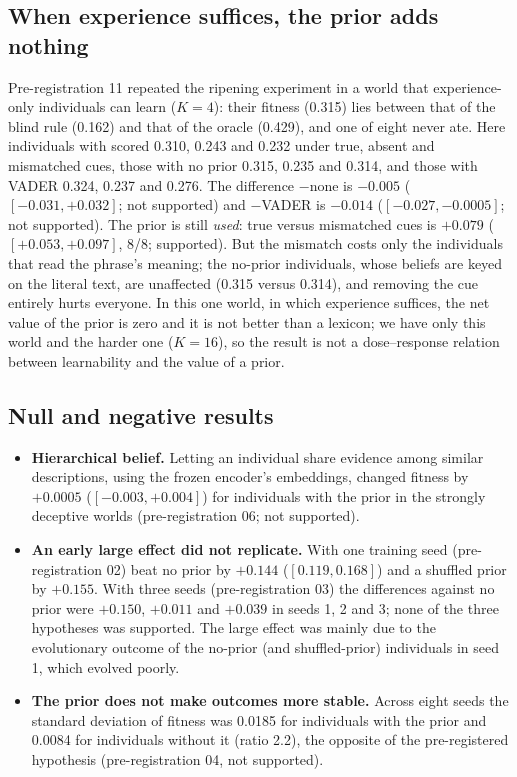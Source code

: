 \subsection{When experience suffices, the prior adds nothing}
\label{sec:res-fair}
Pre-registration 11 repeated the ripening experiment in a world that experience-only individuals can learn ($K=4$): their fitness (0.315) lies between that of the blind rule (0.162) and that of the oracle (0.429), and one of eight never ate. Here individuals with \laya{} scored 0.310, 0.243 and 0.232 under true, absent and mismatched cues, those with no prior 0.315, 0.235 and 0.314, and those with VADER 0.324, 0.237 and 0.276. The difference \laya{}$-$none is $-0.005$ ($[-0.031,+0.032]$; not supported) and \laya{}$-$VADER is $-0.014$ ($[-0.027,-0.0005]$; not supported). The prior is still \emph{used}: true versus mismatched cues is $+0.079$ ($[+0.053,+0.097]$, 8/8; supported). But the mismatch costs only the individuals that read the phrase's meaning; the no-prior individuals, whose beliefs are keyed on the literal text, are unaffected (0.315 versus 0.314), and removing the cue entirely hurts everyone. In this one world, in which experience suffices, the net value of the prior is zero and it is not better than a lexicon; we have only this world and the harder one ($K=16$), so the result is not a dose--response relation between learnability and the value of a prior.

\subsection{Null and negative results}
\label{sec:res-null}
\begin{itemize}
\item \textbf{Hierarchical belief.} Letting an individual share evidence among similar descriptions, using the frozen encoder's embeddings, changed fitness by $+0.0005$ ($[-0.003,+0.004]$) for individuals with the \laya{} prior in the strongly deceptive worlds (pre-registration 06; not supported).
\item \textbf{An early large effect did not replicate.} With one training seed (pre-registration 02) \laya{} beat no prior by $+0.144$ ($[0.119,0.168]$) and a shuffled prior by $+0.155$. With three seeds (pre-registration 03) the differences against no prior were $+0.150$, $+0.011$ and $+0.039$ in seeds 1, 2 and 3; none of the three hypotheses was supported. The large effect was mainly due to the evolutionary outcome of the no-prior (and shuffled-prior) individuals in seed 1, which evolved poorly.
\item \textbf{The prior does not make outcomes more stable.} Across eight seeds the standard deviation of fitness was 0.0185 for individuals with the prior and 0.0084 for individuals without it (ratio 2.2), the opposite of the pre-registered hypothesis (pre-registration 04, not supported).
\end{itemize}
